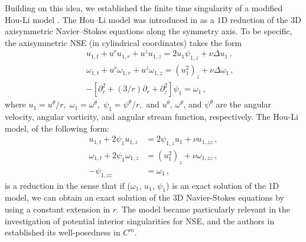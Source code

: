 \documentclass[12pt]{caltech_thesis}
\numberwithin{equation}{section}
\begin{document}
Building on this idea, we established the finite time singularity of a modified Hou-Li model \cite{hou2024blowup}. The Hou–Li model was introduced in \cite{hou2008dynamic} as a 1D reduction of the 3D axisymmetric Navier–Stokes equations along the symmetry axis. To be specific, the axisymmetric NSE (in cylindrical coordinates) takes the form \begin{eqnarray*}
&&u_{1, t}+u^{r} u_{1, r}+u^{z} u_{1, z} =2 u_{1} \psi_{1, z}+\nu\Delta u_1\,, \\
&&\omega_{1, t}+u^{r} \omega_{1, r}+u^{z} \omega_{1, z} =\left(u_{1}^{2}\right)_{z}+\nu\Delta \omega_1\,, \\
&&-\left[\partial_{r}^{2}+(3 / r) \partial_{r}+\partial_{z}^{2}\right] \psi_{1} =\omega_{1}\,,
\end{eqnarray*}
where $u_1 = u^\theta/r,\; \omega_1 = \omega^\theta,\; \psi_1 = \psi^\theta/r, $ and $u^\theta$, $\omega^\theta$, and $\psi^\theta$ are the angular velocity, angular vorticity, and angular stream function, respectively. The Hou-Li model, of the following form:
\begin{equation*}
\begin{aligned}
u_{1, t}+2 \psi_1 u_{1, z} &=2 \psi_{1, z} u_1 +\nu u_{1,zz}\,, \\
\omega_{1, t}+2 \psi_1 \omega_{1, z} &=\left(u_1^{2}\right)_{z}+\nu \omega_{1,zz}\,, \\
- \psi_{1,zz} &=\omega_1\,,
\end{aligned}
\end{equation*}
is a reduction in the sense that if ($\omega_1$, $u_1$, $\psi_1$) is an exact solution of the 1D model, we can obtain an exact solution of the 3D Navier-Stokes equations by using a constant extension in $r$. The model became particularly relevant in the investigation of potential interior singularities for NSE, and the authors in \cite{hou2008dynamic} established its well-posedness in $C^m$.
\end{document}
